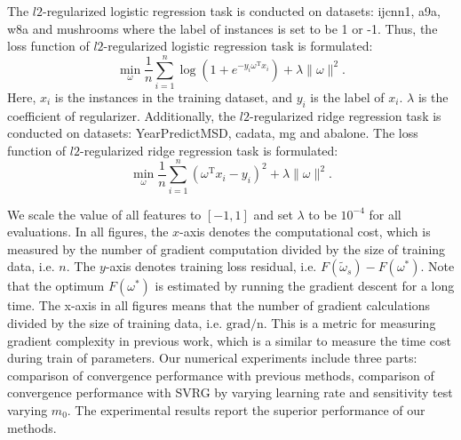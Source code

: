 \documentclass[conference]{IEEEtran}
\begin{document}
 The $l2$-regularized logistic regression task is conducted on datasets: ijcnn1, a9a, w8a and mushrooms where the label of instances  is set to be 1 or -1. Thus, the loss function of $l2$-regularized logistic regression task is formulated:
\begin{equation}
\label{logistic_reg}
\min\limits_\omega \frac{1}{n}\sum\limits_{i=1}^n \log(1+e^{-y_i \omega^\mathrm{T} x_i }) + \lambda \parallel \omega \parallel^2.
\end{equation} Here, $x_i$ is the instances in the training dataset, and $y_i$ is the label of $x_i$. $\lambda$ is the coefficient of regularizer. Additionally, the $l2$-regularized ridge regression task is conducted on  datasets: YearPredictMSD, cadata, mg and abalone. The loss function of $l2$-regularized ridge regression task is formulated:
\begin{equation}
\label{ridge_reg}
\min\limits_\omega \frac{1}{n}\sum\limits_{i=1}^n\left(\omega^{\mathrm{T}}x_i-y_i\right)^2 + \lambda \parallel \omega \parallel^2.
\end{equation}

We scale the value of all features to $[-1,1]$ and set  $\lambda$ to be $10^{-4}$ for all evaluations. 
In all figures, the $x$-axis denotes the computational cost, which is measured by the number of gradient computation divided by the size of training data, i.e. $n$. The $y$-axis denotes training loss residual, i.e. $F(\tilde{\omega}_s) - F(\omega^{*})$. Note that the optimum $F(\omega^{*})$ is estimated by running the gradient descent for a long time. The x-axis in all figures means that the number of gradient calculations divided by the size of training data, i.e. $\mathrm{grad/n}$. This is a metric for measuring gradient complexity in previous work, which is a similar to measure the time cost during train of parameters. Our numerical experiments include three parts: comparison of convergence performance with previous methods, comparison of convergence performance with SVRG by varying learning rate and sensitivity test varying $m_0$. The experimental results report the superior performance of our methods. 
\end{document}
